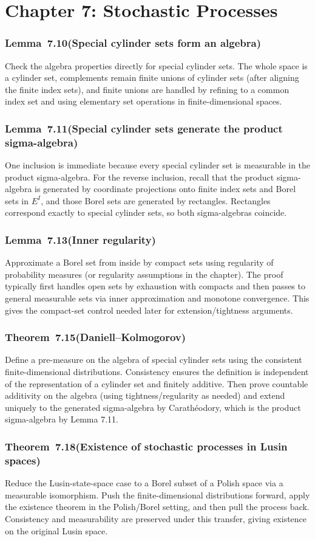 \documentclass[11pt,a4paper]{article}
\newcommand{\proofcapsule}[4]{%
  \subsubsection*{#1~#2\quad \textnormal{\small(#3)}}%
  #4}
\begin{document}
\section{Chapter 7: Stochastic Processes}
\proofcapsule{Lemma}{7.10}{Special cylinder sets form an algebra}{Check the algebra properties directly for special cylinder sets. The whole space is a cylinder set, complements remain finite unions of cylinder sets (after aligning the finite index sets), and finite unions are handled by refining to a common index set and using elementary set operations in finite-dimensional spaces.}
\proofcapsule{Lemma}{7.11}{Special cylinder sets generate the product sigma-algebra}{One inclusion is immediate because every special cylinder set is measurable in the product sigma-algebra. For the reverse inclusion, recall that the product sigma-algebra is generated by coordinate projections onto finite index sets and Borel sets in $E^I$, and those Borel sets are generated by rectangles. Rectangles correspond exactly to special cylinder sets, so both sigma-algebras coincide.}
\proofcapsule{Lemma}{7.13}{Inner regularity}{Approximate a Borel set from inside by compact sets using regularity of probability measures (or regularity assumptions in the chapter). The proof typically first handles open sets by exhaustion with compacts and then passes to general measurable sets via inner approximation and monotone convergence. This gives the compact-set control needed later for extension/tightness arguments.}
\proofcapsule{Theorem}{7.15}{Daniell--Kolmogorov}{Define a pre-measure on the algebra of special cylinder sets using the consistent finite-dimensional distributions. Consistency ensures the definition is independent of the representation of a cylinder set and finitely additive. Then prove countable additivity on the algebra (using tightness/regularity as needed) and extend uniquely to the generated sigma-algebra by Carathéodory, which is the product sigma-algebra by Lemma 7.11.}
\proofcapsule{Theorem}{7.18}{Existence of stochastic processes in Lusin spaces}{Reduce the Lusin-state-space case to a Borel subset of a Polish space via a measurable isomorphism. Push the finite-dimensional distributions forward, apply the existence theorem in the Polish/Borel setting, and then pull the process back. Consistency and measurability are preserved under this transfer, giving existence on the original Lusin space.}
\end{document}
